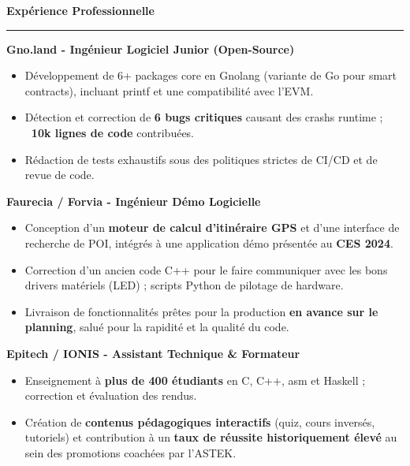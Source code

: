 \documentclass[9pt]{extarticle}
\begin{document}
\par\vspace{5pt}

{\large\bfseries Expérience Professionnelle}
\par\vspace{-8pt}
\rule{\linewidth}{0.4pt}
\par\vspace{5pt}

{\bfseries Gno.land - Ingénieur Logiciel Junior (Open-Source)}
\begin{itemize}[noitemsep, topsep=0pt]
	\item Développement de 6+ packages core en Gnolang (variante de Go pour smart contracts), incluant printf et une compatibilité avec l'EVM.
	\item Détection et correction de {\bfseries 6 bugs critiques} causant des crashs runtime ; {\bfseries ~10k lignes de code} contribuées.
	\item Rédaction de tests exhaustifs sous des politiques strictes de CI/CD et de revue de code.
\end{itemize}

\par\vspace{5pt}

{\bfseries Faurecia / Forvia - Ingénieur Démo Logicielle}
\begin{itemize}[noitemsep, topsep=0pt]
	\item Conception d'un {\bfseries moteur de calcul d'itinéraire GPS} et d'une interface de recherche de POI, intégrés à une application démo présentée au {\bfseries CES 2024}.
	\item Correction d'un ancien code C++ pour le faire communiquer avec les bons drivers matériels (LED) ; scripts Python de pilotage de hardware.
	\item Livraison de fonctionnalités prêtes pour la production {\bfseries en avance sur le planning}, salué pour la rapidité et la qualité du code.
\end{itemize}

\par\vspace{5pt}

{\bfseries Epitech / IONIS - Assistant Technique \& Formateur}
\begin{itemize}[noitemsep, topsep=0pt]
	\item Enseignement à {\bfseries plus de 400 étudiants} en C, C++, asm et Haskell ; correction et évaluation des rendus.
	\item Création de {\bfseries contenus pédagogiques interactifs} (quiz, cours inversés, tutoriels) et contribution à un {\bfseries taux de réussite historiquement élevé} au sein des promotions coachées par l'ASTEK.
\end{itemize}
\end{document}
